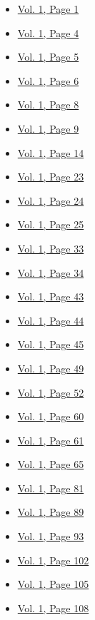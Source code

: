 \begin{itemize}
  \begin{itemize}
  \tightlist
  \item
    \protect\hyperlink{g-page-9}{Vol. 1, Page 1}
  \item
    \protect\hyperlink{g-page-12}{Vol. 1, Page 4}
  \item
    \protect\hyperlink{g-page-13}{Vol. 1, Page 5}
  \item
    \protect\hyperlink{g-page-14}{Vol. 1, Page 6}
  \item
    \protect\hyperlink{g-page-16}{Vol. 1, Page 8}
  \item
    \protect\hyperlink{g-page-17}{Vol. 1, Page 9}
  \item
    \protect\hyperlink{g-page-22}{Vol. 1, Page 14}
  \item
    \protect\hyperlink{g-page-31}{Vol. 1, Page 23}
  \item
    \protect\hyperlink{g-page-32}{Vol. 1, Page 24}
  \item
    \protect\hyperlink{g-page-33}{Vol. 1, Page 25}
  \item
    \protect\hyperlink{g-page-41}{Vol. 1, Page 33}
  \item
    \protect\hyperlink{g-page-42}{Vol. 1, Page 34}
  \item
    \protect\hyperlink{g-page-51}{Vol. 1, Page 43}
  \item
    \protect\hyperlink{g-page-52}{Vol. 1, Page 44}
  \item
    \protect\hyperlink{g-page-53}{Vol. 1, Page 45}
  \item
    \protect\hyperlink{g-page-57}{Vol. 1, Page 49}
  \item
    \protect\hyperlink{g-page-60}{Vol. 1, Page 52}
  \item
    \protect\hyperlink{g-page-68}{Vol. 1, Page 60}
  \item
    \protect\hyperlink{g-page-69}{Vol. 1, Page 61}
  \item
    \protect\hyperlink{g-page-73}{Vol. 1, Page 65}
  \item
    \protect\hyperlink{g-page-89}{Vol. 1, Page 81}
  \item
    \protect\hyperlink{g-page-97}{Vol. 1, Page 89}
  \item
    \protect\hyperlink{g-page-101}{Vol. 1, Page 93}
  \item
    \protect\hyperlink{g-page-110}{Vol. 1, Page 102}
  \item
    \protect\hyperlink{g-page-113}{Vol. 1, Page 105}
  \item
    \protect\hyperlink{g-page-116}{Vol. 1, Page 108}

\end{itemize}
\end{itemize}
